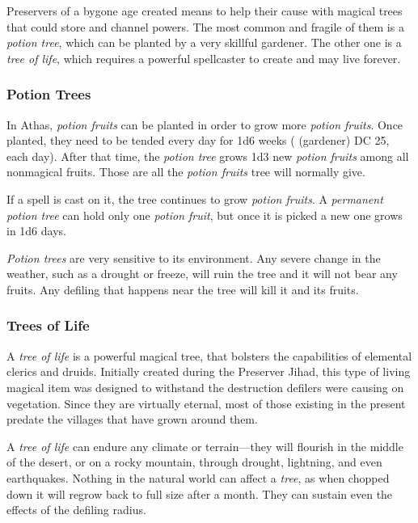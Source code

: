 Preservers of a bygone age created means to help their cause with magical trees that could store and channel powers. The most common and fragile of them is a \emph{potion tree}, which can be planted by a very skillful gardener. The other one is a \emph{tree of life}, which requires a powerful spellcaster to create and may live forever.

\subsubsection{Potion Trees}
In Athas, \emph{potion fruits} can be planted in order to grow more \emph{potion fruits}. Once planted, they need to be tended every day for 1d6 weeks ( (gardener) DC 25, each day). After that time, the \emph{potion tree} grows 1d3 new \emph{potion fruits} among all nonmagical fruits. Those are all the \emph{potion fruits} tree will normally give.

If a  spell is cast on it, the tree continues to grow \emph{potion fruits}. A \emph{permanent potion tree} can hold only one \emph{potion fruit}, but once it is picked a new one grows in 1d6 days.

\emph{Potion trees} are very sensitive to its environment. Any severe change in the weather, such as a drought or freeze, will ruin the tree and it will not bear any fruits. Any defiling that happens near the tree will kill it and its fruits.

\subsubsection{Trees of Life}
A \emph{tree of life} is a powerful magical tree, that bolsters the capabilities of elemental clerics and druids. Initially created during the Preserver Jihad, this type of living magical item was designed to withstand the destruction defilers were causing on vegetation. Since they are virtually eternal, most of those existing in the present predate the villages that have grown around them.

A \emph{tree of life} can endure any climate or terrain---they will flourish in the middle of the desert, or on a rocky mountain, through drought, lightning, and even earthquakes. Nothing in the natural world can affect a \emph{tree}, as when chopped down it will regrow back to full size after a month. They can sustain even the effects of the defiling radius.

